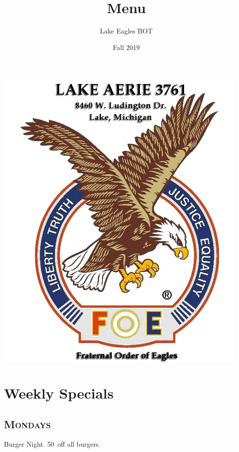 \documentclass{tufte-handout}
\title{Menu}
\author[BOT]{Lake Eagles BOT}
\date{Fall 2019}
\begin{document}
\maketitle

\begin{marginfigure}%
  \includegraphics[width=\linewidth]{Lake_Aerie_3761}
\end{marginfigure}

\begin{abstract}

\end{abstract}

\section{Weekly Specials}
\subsection{\textsc{Mondays}}
Burger Night. 50\textcent \ off all burgers.
\end{document}
